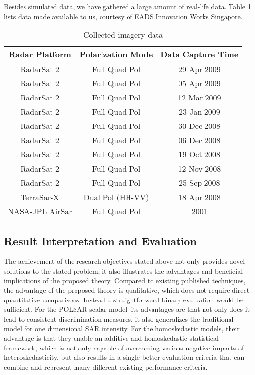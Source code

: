Besides simulated  data, we have gathered a large amount of real-life data.
Table \ref{tbl:collected_data} lists data made available to us, courtesy of EADS Innovation Works Singapore. 

\begin{table}
\centering
\begin{tabular}{|c|c|c|}
\hline
Radar Platform & Polarization Mode & Data Capture Time \\
\hline
RadarSat 2 & Full Quad Pol & 29 Apr 2009 \\
RadarSat 2 & Full Quad Pol & 05 Apr 2009 \\
RadarSat 2 & Full Quad Pol & 12 Mar 2009 \\
RadarSat 2 & Full Quad Pol & 23 Jan 2009 \\
RadarSat 2 & Full Quad Pol & 30 Dec 2008 \\
RadarSat 2 & Full Quad Pol & 06 Dec 2008 \\
RadarSat 2 & Full Quad Pol & 19 Oct 2008 \\
RadarSat 2 & Full Quad Pol & 12 Nov 2008 \\
RadarSat 2 & Full Quad Pol & 25 Sep 2008 \\
TerraSar-X & Dual Pol (HH-VV) & 18 Apr 2008 \\
NASA-JPL AirSar & Full Quad Pol & 2001 \\
\hline
\end{tabular}
\caption{Collected imagery data}
\label{tbl:collected_data}
\end{table}

\subsection{Result Interpretation and Evaluation}

The
                achievement of the research objectives stated above not only provides
                novel solutions to the stated problem, it also
                illustrates the advantages and beneficial implications
                of the proposed theory.  
Compared
                to existing published techniques, the advantage of the
                proposed theory is qualitative, which does not require
                direct quantitative comparisons.
Instead
                a straightforward binary evaluation would be sufficient.
For
                the POLSAR scalar model, its advantages are that not
                only does it lead to consistent discrimination measures, it
                also generalizes the traditional model for one
                dimensional SAR intensity.
For
                the homoskedastic models, their advantage is that they
                enable an additive and homoskedastic statistical
                framework, which is not only capable of overcoming various
                negative impacts of heteroskedasticity, but also results
                in a single better evaluation criteria that can combine
                and represent many different existing performance
                criteria.
                
